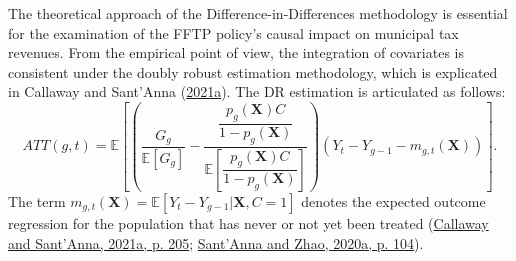 \documentclass[12pt, a4paper, twoside]{article}
\numberwithin{equation}{subsection} %
\begin{document}
The theoretical approach of the Difference-in-Differences methodology is
essential for the examination of the FFTP policy's causal impact on
municipal tax revenues. From the empirical point of view, the
integration of covariates is consistent under the doubly robust
estimation methodology, which is explicated in Callaway and Sant'Anna
(\protect\hyperlink{ref-CALLAWAY2021200}{2021a}). The DR estimation is
articulated as follows: \begin{equation}
\label{eq-dr-identification}
    ATT(g, t) = \mathbb{E} \left[ \left(\frac{G_g}{\mathbb{E}[G_g]} - \dfrac{ \dfrac{p_g(\boldsymbol{X}) C}{1 - p_g(\boldsymbol{X})}     }{\mathbb{E} \left[\dfrac{p_g(\boldsymbol{X}) C}{1 - p_g(\boldsymbol{X})} \right]} \right) (Y_t - Y_{g-1} - m_{g,t}(\boldsymbol{X}) ) \right].
\end{equation} The term
\(m_{g,t}(\boldsymbol{X}) = \mathbb{E}[Y_t - Y_{g-1}|\boldsymbol{X}, C = 1]\)
denotes the expected outcome regression for the population that has
never or not yet been treated
(\protect\hyperlink{ref-CALLAWAY2021200}{Callaway and Sant'Anna, 2021a,
p. 205}; \protect\hyperlink{ref-SANTANNA2020101}{Sant'Anna and Zhao,
2020a, p. 104}).
\end{document}
